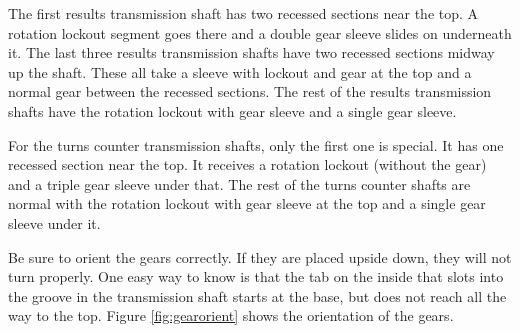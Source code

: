 \documentclass[openany]{book}
\begin{document}
The first results transmission shaft has two recessed sections near the top. A rotation lockout segment goes there and a double gear sleeve slides on underneath it. The last three results transmission shafts have two recessed sections midway up the shaft. These all take a sleeve with lockout and gear at the top and a normal gear between the recessed sections. The rest of the results transmission shafts have the rotation lockout with gear sleeve and a single gear sleeve.

For the turns counter transmission shafts, only the first one is special. It has one recessed section near the top. It receives a rotation lockout (without the gear) and a triple gear sleeve under that. The rest of the turns counter shafts are normal with the rotation lockout with gear sleeve at the top and a single gear sleeve under it. 

Be sure to orient the gears correctly. If they are placed upside down, they will not turn properly. One easy way to know is that the tab on the inside that slots into the groove in the transmission shaft starts at the base, but does not reach all the way to the top. Figure \ref{fig:gearorient} shows the orientation of the gears.
\end{document}
